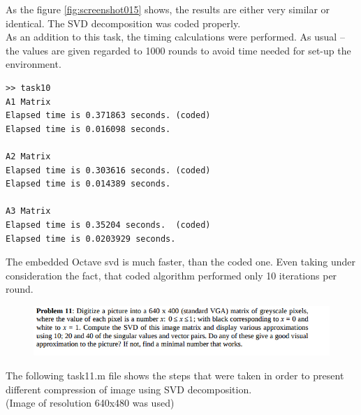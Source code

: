 \documentclass[eng,openany]{mgr}
\begin{document}
As the figure \ref{fig:screenshot015} shows, the results are either very similar or identical. The SVD decomposition was coded properly. \\

As an addition to this task, the timing calculations were performed.
As usual -- the values are given regarded to 1000 rounds to avoid time needed for set-up the environment.
\begin{lstlisting}
>> task10
A1 Matrix
Elapsed time is 0.371863 seconds. (coded)
Elapsed time is 0.016098 seconds.

A2 Matrix
Elapsed time is 0.303616 seconds. (coded)
Elapsed time is 0.014389 seconds.

A3 Matrix
Elapsed time is 0.35204 seconds.  (coded)
Elapsed time is 0.0203929 seconds.
\end{lstlisting}

The embedded Octave svd is much faster, than the coded one. Even taking under consideration the fact, that coded algorithm performed only 10 iterations per round.
\newpage
\begin{figure}[h]
\centering
\includegraphics[width=0.8\linewidth]{screenshot016}
\label{fig:screenshot016}
\end{figure}
The following task11.m file shows the steps that were taken in order to present different compression of image using SVD decomposition.\\
(Image of resolution 640x480 was used)
\end{document}
